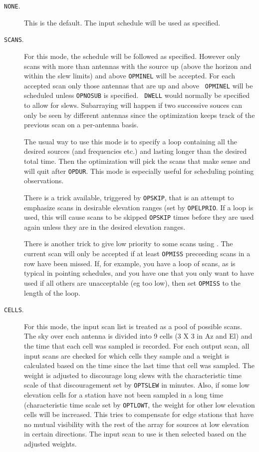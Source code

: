 \documentclass{report}
\begin{document}
\begin{description}

\item[{\tt NONE}.]  This is the default.  The input schedule will
be used as specified.

\item[{\tt SCANS}.]  For this mode, the schedule will be followed as
specified.  However only scans with more than  antennas with the source up (above the horizon
and within the slew limits) and above {\tt OPMINEL} will be accepted.
For each accepted scan only those antennas that are up and above {\tt
OPMINEL} will be scheduled unless {\tt OPNOSUB} is specified.  {\tt
DWELL} would normally be specified to allow for slews.  Subarraying
will happen if two successive souces can only be seen by different
antennas since the optimization keeps track of the previous scan on a
per-antenna basis.

The usual way to use this mode is to specify a loop containing all
the desired sources (and frequencies etc.) and lasting longer than
the desired total time.  Then the optimization will pick the scans
that make sense and will quit after {\tt OPDUR}.  This mode is
especially useful for scheduling pointing observations.

There is a trick available, triggered by {\tt OPSKIP}, that is an
attempt to emphasize scans in desirable elevation ranges (set by
{\tt OPELPRIO}.  If a loop is used, this will cause scans to be
skipped {\tt OPSKIP} times before they are used again unless they
are in the desired elevation ranges.

There is another trick to give low priority to some scans using
.  The current scan will only
be accepted if at least {\tt OPMISS} preceeding scans in a row
have been missed.  If, for example, you have a loop of scans,
as is typical in pointing schedules, and you have one that you
only want to have used if all others are unacceptable (eg too low),
then set {\tt OPMISS} to the length of the loop.

\item[{\tt CELLS}.]  For this mode, the input scan list is treated
as a pool of possible scans.  The sky over each antenna is divided
into 9 cells (3 X 3 in Az and El) and the time that each cell
was sampled is recorded.  For each output scan, all input scans
are checked for which cells they sample and a weight is calculated
based on the time since the last time that cell was sampled.  The
weight is adjusted to discourage long slews with the characteristic
time scale of that discouragement set by {\tt OPTSLEW} in minutes.
Also, if some low elevation cells for a station have not been
sampled in a long time (characteristic time scale set by {\tt OPTLOWT},
the weight for other low elevation cells will be increased.  This
tries to compensate for edge stations that have no mutual visibility
with the rest of the array for sources at low elevation in certain
directions.  The input scan to use is then selected based on the
adjusted weights.


\end{description}
\end{document}
